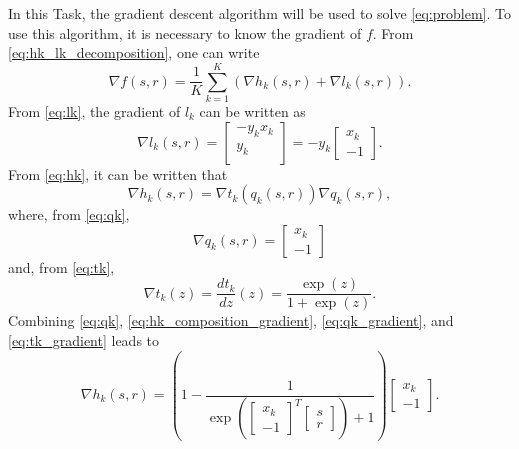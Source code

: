 \documentclass[12pt]{article}
\begin{document}
In this Task, the gradient descent algorithm will be used to solve \eqref{eq:problem}. To use this algorithm, it is necessary to know the gradient of $f$. From \eqref{eq:hk_lk_decomposition}, one can write
\begin{equation} \label{eq:gradient}
    \nabla f(s,r) = \frac{1}{K} \sum_{k=1}^K (\nabla h_k(s,r) + \nabla l_k(s,r)).
\end{equation}
From \eqref{eq:lk}, the gradient of $l_k$ can be written as
\begin{equation} \label{eq:lk_gradient}
    \nabla l_k (s,r) = 
    \begin{bmatrix}
    -y_k x_k \\
    y_k \\
    \end{bmatrix} = 
    -y_k \begin{bmatrix}
    x_k \\
    -1
    \end{bmatrix}.
\end{equation}
From \eqref{eq:hk}, it can be written that
\begin{equation} \label{eq:hk_composition_gradient}
    \nabla h_k(s,r) = \nabla t_k (q_k(s,r)) \nabla q_k(s,r),
\end{equation}
where, from \eqref{eq:qk},
\begin{equation} \label{eq:qk_gradient}
    \nabla q_k (s,r) =
    \begin{bmatrix}
    x_k \\
    -1
    \end{bmatrix}
\end{equation}
and, from \eqref{eq:tk},
\begin{equation} \label{eq:tk_gradient}
    \nabla t_k(z) = \dfrac{d t_k}{d z} (z) = \frac{\exp(z)}{1+\exp(z)}.
\end{equation}
Combining \eqref{eq:qk}, \eqref{eq:hk_composition_gradient}, \eqref{eq:qk_gradient}, and \eqref{eq:tk_gradient} leads to
\begin{equation} \label{eq:hk_gradient}
    \nabla h_k (s,r) = \left (1 - \frac{1}{\exp \left(
    \begin{bmatrix}
    x_k \\
    -1
    \end{bmatrix}^T
    \begin{bmatrix}
    s \\
    r
    \end{bmatrix}
    \right) + 1} \right)
    \begin{bmatrix}
    x_k \\
    -1
    \end{bmatrix}.
\end{equation}
\end{document}
